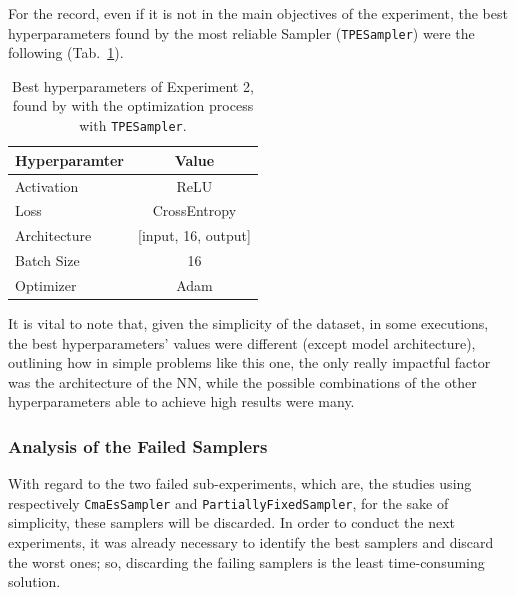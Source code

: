 For the record, even if it is not in the main objectives of the experiment, the best hyperparameters found by the most reliable Sampler (\texttt{TPESampler}) were the following (Tab.~\ref{tab:table-4.2.3}).
\begin{table}[ht!]
	\center
	\setlength{\tabcolsep}{0.5cm}
	\caption[Best Hyperparameters of Experiment 2]{Best hyperparameters of Experiment 2, found by with the optimization process with \texttt{TPESampler}.}
	\begin{tabular}{@{}lc@{}}
		\toprule
		\textbf{Hyperparamter} & \textbf{Value}          \\ \midrule
		Activation             & ReLU                    \\[0.1cm]
		Loss                   & CrossEntropy            \\[0.1cm]
		Architecture           & {[}input, 16, output{]} \\[0.1cm]
		Batch Size             & 16                      \\[0.1cm]
		Optimizer              & Adam                    \\ \bottomrule
	\end{tabular}
	\label{tab:table-4.2.3}
\end{table}
It is vital to note that, given the simplicity of the dataset, in some executions, the best hyperparameters' values were different (except model architecture), outlining how in simple problems like this one, the only really impactful factor was the architecture of the NN, while the possible combinations of the other hyperparameters able to achieve high results were many.

\subsubsection{Analysis of the Failed Samplers}

With regard to the two failed sub-experiments, which are, the studies using respectively \texttt{CmaEsSampler} and \texttt{PartiallyFixedSampler}, for the sake of simplicity, these samplers will be discarded.
In order to conduct the next experiments, it was already necessary to identify the best samplers and discard the worst ones; so, discarding the failing samplers is the least time-consuming solution.

